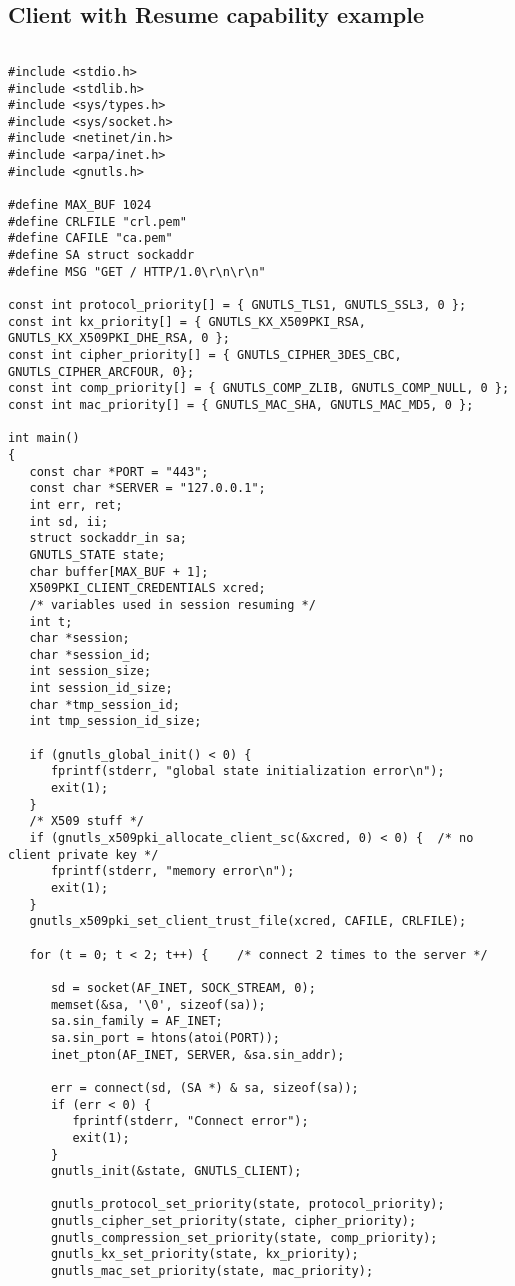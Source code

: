 \subsection{Client with Resume capability example}
\label{resume-example}
\begin{verbatim}

#include <stdio.h>
#include <stdlib.h>
#include <sys/types.h>
#include <sys/socket.h>
#include <netinet/in.h>
#include <arpa/inet.h>
#include <gnutls.h>

#define MAX_BUF 1024
#define CRLFILE "crl.pem"
#define CAFILE "ca.pem"
#define SA struct sockaddr
#define MSG "GET / HTTP/1.0\r\n\r\n"

const int protocol_priority[] = { GNUTLS_TLS1, GNUTLS_SSL3, 0 };
const int kx_priority[] = { GNUTLS_KX_X509PKI_RSA, GNUTLS_KX_X509PKI_DHE_RSA, 0 };
const int cipher_priority[] = { GNUTLS_CIPHER_3DES_CBC, GNUTLS_CIPHER_ARCFOUR, 0};
const int comp_priority[] = { GNUTLS_COMP_ZLIB, GNUTLS_COMP_NULL, 0 };
const int mac_priority[] = { GNUTLS_MAC_SHA, GNUTLS_MAC_MD5, 0 };

int main()
{
   const char *PORT = "443";
   const char *SERVER = "127.0.0.1";
   int err, ret;
   int sd, ii;
   struct sockaddr_in sa;
   GNUTLS_STATE state;
   char buffer[MAX_BUF + 1];
   X509PKI_CLIENT_CREDENTIALS xcred;
   /* variables used in session resuming */
   int t;
   char *session;
   char *session_id;
   int session_size;
   int session_id_size;
   char *tmp_session_id;
   int tmp_session_id_size;

   if (gnutls_global_init() < 0) {
      fprintf(stderr, "global state initialization error\n");
      exit(1);
   }
   /* X509 stuff */
   if (gnutls_x509pki_allocate_client_sc(&xcred, 0) < 0) {  /* no client private key */
      fprintf(stderr, "memory error\n");
      exit(1);
   }
   gnutls_x509pki_set_client_trust_file(xcred, CAFILE, CRLFILE);

   for (t = 0; t < 2; t++) {    /* connect 2 times to the server */

      sd = socket(AF_INET, SOCK_STREAM, 0);
      memset(&sa, '\0', sizeof(sa));
      sa.sin_family = AF_INET;
      sa.sin_port = htons(atoi(PORT));
      inet_pton(AF_INET, SERVER, &sa.sin_addr);

      err = connect(sd, (SA *) & sa, sizeof(sa));
      if (err < 0) {
         fprintf(stderr, "Connect error");
         exit(1);
      }
      gnutls_init(&state, GNUTLS_CLIENT);

      gnutls_protocol_set_priority(state, protocol_priority);
      gnutls_cipher_set_priority(state, cipher_priority);
      gnutls_compression_set_priority(state, comp_priority);
      gnutls_kx_set_priority(state, kx_priority);
      gnutls_mac_set_priority(state, mac_priority);


\end{verbatim}
